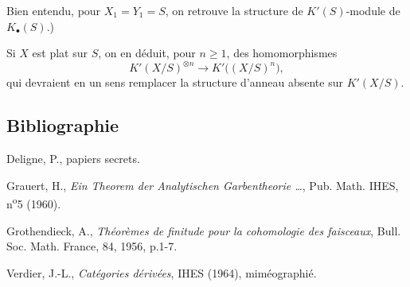 Bien entendu, pour \(X_1=Y_1=S\), on retrouve la structure de \(K'(S)\)-module de \(K_{\bullet}(S)\).)

Si \(X\) est plat sur \(S\), on en déduit, pour \(n\geq1\), des homomorphismes
\[
 K'(X/S)^{\otimes n}\longrightarrow K'\bigl((X/S)^n\bigr),
\]
qui devraient en un sens remplacer la structure d'anneau absente sur \(K'(X/S)\).

\subsection*{Bibliographie}
\begin{enumerate}[label={[\arabic*]}]
\item Deligne, P., papiers secrets.
\item Grauert, H., \emph{Ein Theorem der Analytischen Garbentheorie \dots}, Pub. Math. IHES, n\textsuperscript{o}5 (1960).
\item Grothendieck, A., \emph{Théorèmes de finitude pour la cohomologie des faisceaux}, Bull. Soc. Math. France, 84, 1956, p.1-7.
\item[{[V]}] Verdier, J.-L., \emph{Catégories dérivées}, IHES (1964), miméographié.
\end{enumerate}



\providecommand{\Chat}{\widehat C}
\providecommand{\Ghat}{\widehat G}
\providecommand{\Gg}{\widehat G_g}
\providecommand{\Ga}{\widehat G_a}
\providecommand{\Grhat}{\widehat{\operatorname{Gr}}}
\providecommand{\Abfil}{\mathrm{Ab\,fil}}
\providecommand{\Kalgfil}{K\text{-}\mathrm{Alg.fil.}}
\providecommand{\Hom}{\operatorname{Hom}}
\providecommand{\Sym}{\mathfrak S}
\renewcommand{\id}{\operatorname{Id}}
\providecommand{\Log}{\operatorname{Log}}
\providecommand{\Toddc}{\operatorname{Todd}}
\renewcommand{\Ob}{\operatorname{Ob}}
\providecommand{\cG}{\mathcal G}
\providecommand{\cCzero}{\mathcal C_0}
\providecommand{\Fil}{\operatorname{Fil}}


